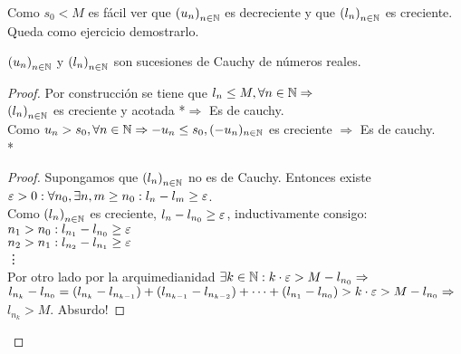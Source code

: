Como \(s_0 < M\) es fácil ver que \({(u_n)}_{n \in \mathbb{N}} \) es decreciente y que \({(l_n)}_{n \in \mathbb{N}} \) es creciente. Queda como ejercicio demostrarlo.
\begin{lemma}
	\({(u_n)}_{n \in \mathbb{N}} \) y \({(l_n)}_{n \in \mathbb{N}} \) son sucesiones de Cauchy de números reales.
	\begin{proof}
		Por construcción se tiene que \(l_n \leq M, \forall n \in \mathbb{N} \Rightarrow \) \\
		\({(l_n)}_{n \in \mathbb{N}} \) es creciente y acotada *\(\Rightarrow \) Es de cauchy. \\

		Como \(u_n > s_0, \forall n \in \mathbb{N} \Rightarrow -u_n \leq s_0, (-u_n)_{n \in \mathbb{N}} \) es creciente \(\Rightarrow \) Es de cauchy. \\

		* \begin{proof}
			Supongamos que \({(l_n)}_{n \in \mathbb{N}} \) no es de Cauchy. Entonces existe \(\varepsilon > 0 : \forall n_0, \exists n, m \geq n_0 : l_n - l_m \geq \varepsilon \). \\
			Como \({(l_n)}_{n \in \mathbb{N}} \) es creciente, \(l_n - l_{n_0} \geq \varepsilon \), inductivamente consigo: \\
			\(n_1 > n_0 : l_{n_1} - l_{n_0} \geq \varepsilon \) \\
			\(n_2 > n_1 : l_{n_2} - l_{n_1} \geq \varepsilon \) \\
			\vdots \\

			Por otro lado por la arquimedianidad \(\exists k \in \mathbb{N} : k \cdot \varepsilon > M - l_{n_0} \Rightarrow \) \\
			\(l_{n_k} - l_{n_0} = (l_{n_k} - l_{n_{k-1}}) + (l_{n_{k-1}} - l_{n_{k-2}}) + \cdots + (l_{n_1} - l_{n_0}) > k \cdot \varepsilon > M - l_{n_0} \Rightarrow \) \\
			\(l_{n_k} > M\). Absurdo!
		\end{proof}
	\end{proof}
\end{lemma}

\clearpage


